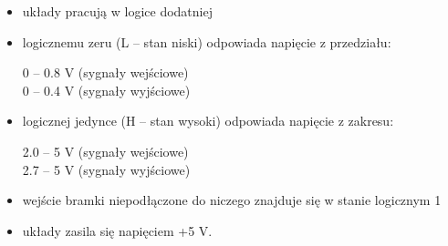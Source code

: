 \begin{itemize}
    \item układy pracują w logice dodatniej
    \item logicznemu zeru (L – stan niski) odpowiada napięcie z przedziału:
        \begin{center}
             0 – 0.8 V (sygnały wejściowe) \\
             0 – 0.4 V (sygnały wyjściowe)
        \end{center}
    \item logicznej jedynce (H – stan wysoki) odpowiada napięcie z zakresu:
        \begin{center}
            2.0 – 5 V (sygnały wejściowe) \\
            2.7 – 5 V (sygnały wyjściowe)
        \end{center}
    \item wejście bramki niepodłączone do niczego znajduje się w stanie logicznym 1
    \item układy zasila się napięciem +5 V.
\end{itemize}

\pagebreak
